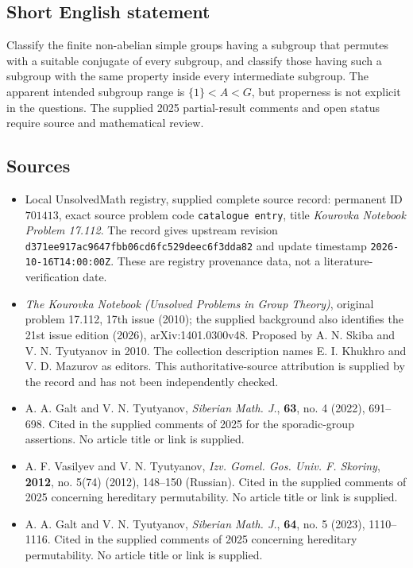 \documentclass[11pt]{article}
\begin{document}
\subsection{Short English statement}
Classify the finite non-abelian simple groups having a subgroup that permutes with a suitable conjugate of every subgroup, and classify those having such a subgroup with the same property inside every intermediate subgroup. The apparent intended subgroup range is \(\{1\}<A<G\), but properness is not explicit in the questions. The supplied 2025 partial-result comments and open status require source and mathematical review.
\subsection{Sources}
\begin{itemize}
\item Local UnsolvedMath registry, supplied complete source record: permanent ID \(701413\), exact source problem code \texttt{catalogue entry}, title \emph{Kourovka Notebook Problem 17.112}. The record gives upstream revision \texttt{d371ee917ac9647fbb06cd6fc529deec6f3dda82} and update timestamp \texttt{2026-10-16T14:00:00Z}. These are registry provenance data, not a literature-verification date.
\item \emph{The Kourovka Notebook (Unsolved Problems in Group Theory)}, original problem 17.112, 17th issue (2010); the supplied background also identifies the 21st issue edition (2026), arXiv:1401.0300v48. Proposed by A. N. Skiba and V. N. Tyutyanov in 2010. The collection description names E. I. Khukhro and V. D. Mazurov as editors. This authoritative-source attribution is supplied by the record and has not been independently checked.
\item A. A. Galt and V. N. Tyutyanov, \emph{Siberian Math. J.}, \textbf{63}, no. 4 (2022), 691--698. Cited in the supplied comments of 2025 for the sporadic-group assertions. No article title or link is supplied.
\item A. F. Vasilyev and V. N. Tyutyanov, \emph{Izv. Gomel. Gos. Univ. F. Skoriny}, \textbf{2012}, no. 5(74) (2012), 148--150 (Russian). Cited in the supplied comments of 2025 concerning hereditary permutability. No article title or link is supplied.
\item A. A. Galt and V. N. Tyutyanov, \emph{Siberian Math. J.}, \textbf{64}, no. 5 (2023), 1110--1116. Cited in the supplied comments of 2025 concerning hereditary permutability. No article title or link is supplied.
\end{itemize}
\end{document}
